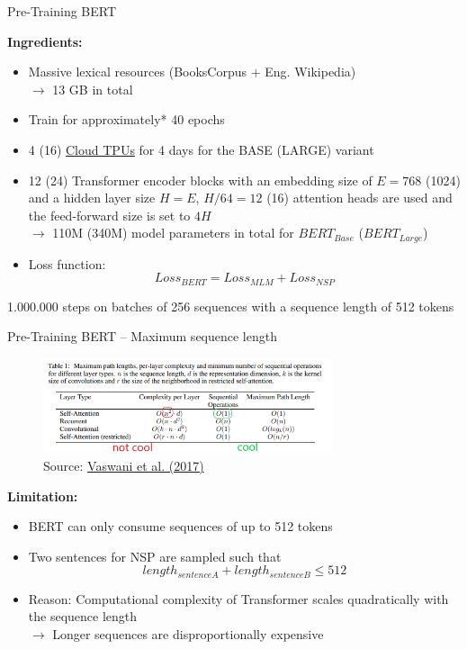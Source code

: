 \documentclass[]{beamer}
\begin{document}
\begin{frame}{Pre-Training BERT}

\textbf{Ingredients:}

\begin{itemize}
	\item Massive lexical resources (BooksCorpus $+$ Eng. Wikipedia)\\
				$\rightarrow$ 13 GB in total
	\item Train for approximately* 40 epochs
	\item 4 (16) \href{https://cloud.google.com/tpu/}{Cloud TPUs} for 4 days for the BASE (LARGE) variant
	\item 12 (24) Transformer encoder blocks with an embedding size of $E = 768$ (1024) and a hidden layer size $H = E$, $H/64 = 12$ (16) attention heads are used and the feed-forward size is set to $4H$\\
				$\rightarrow$ 110M (340M) model parameters in total for $BERT_{Base}$ ($BERT_{Large}$)
	\item Loss function: $$Loss_{BERT} = Loss_{MLM} + Loss_{NSP}$$
\end{itemize}
				\vspace{.3cm}
				{\scriptsize *1.000.000 steps on batches of 256 sequences with a sequence length of 512 tokens}
\end{frame}



\begin{frame}{Pre-Training BERT -- Maximum sequence length}

\begin{figure}
\centering
\includegraphics[width = 8.5cm]{figure/bert-problem.png}\\ 
\footnotesize{Source:} \href{https://arxiv.org/pdf/1706.03762.pdf}{\footnotesize Vaswani et al. (2017)}
\end{figure}

\textbf{Limitation:}

\begin{itemize}
	\item BERT can only consume sequences of up to 512 tokens
	\item Two sentences for NSP are sampled such that $$length_{sentence A} + length_{sentence B} \leq 512$$
	\item Reason: Computational complexity of Transformer scales quadratically with the sequence length\\
				$\rightarrow$ Longer sequences are disproportionally expensive
\end{itemize}
\end{frame}
\end{document}
